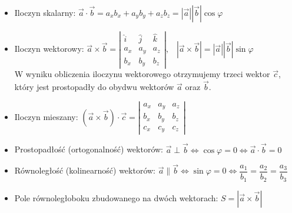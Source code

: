 \documentclass[10pt, twoside, fleqn]{article}
\begin{document}
\begin{itemize}

\item Iloczyn skalarny: \hspace{10pt}	
				$ \vec{a} \cdot \vec{b} 
					= a_x b_x + a_y b_y + a_z b_z
					= |\vec{a}| |\vec{b}| \cos{\varphi} $

\item Iloczyn wektorowy: \hspace{10pt}
				$ \vec{a} \times \vec{b} = 
					\left| 
					\begin{array}{ccc}
						\hat{i} & \hat{j} & \hat{k} \\
						a_x & a_y & a_z \\
						b_x & b_y & b_z 
					\end{array} 
					\right| 
					, \hspace{10pt} 	
					| \vec{a} \times \vec{b}	 | = 
					|\vec{a}| |\vec{b}| \sin{\varphi}	
				$
		\\W wyniku obliczenia iloczynu wektorowego otrzymujemy trzeci
		wektor $\vec{c}$, który jest prostopadły do obydwu wektorów
		$\vec{a}$ oraz $\vec{b}$.

\item Iloczyn mieszany: \hspace{10pt}
				$ \left( \vec{a} \times \vec{b} \right) \cdot \vec{c} = 
					\left| 
					\begin{array}{ccc}
						a_x & a_y & a_z \\
						b_x & b_y & b_z \\
						c_x & c_y & c_z 
					\end{array} 
					\right| 
				$					
					
					
\item Prostopadłość (ortogonalność) wektorów: \hspace{10pt}
				$ \vec{a} \perp \vec{b} 
					\Leftrightarrow 
				  \cos{\varphi} = 0
					\Leftrightarrow
				  \vec{a} \cdot \vec{b} = 0 $
				  
\item Równoległość (kolinearność) wektorów: \hspace{10pt}
				$ \vec{a} \parallel \vec{b} 
					\Leftrightarrow 
				  \sin{\varphi} = 0
					\Leftrightarrow
				  \dfrac{a_1}{b_1} = 
				  \dfrac{a_2}{b_2} = 
				  \dfrac{a_3}{b_3} $		
				
\item Pole równoległoboku zbudowanego na dwóch wektorach: \hspace{10pt}
				$ S = | \vec{a} \times \vec{b} | $
				

\end{itemize}
\end{document}
